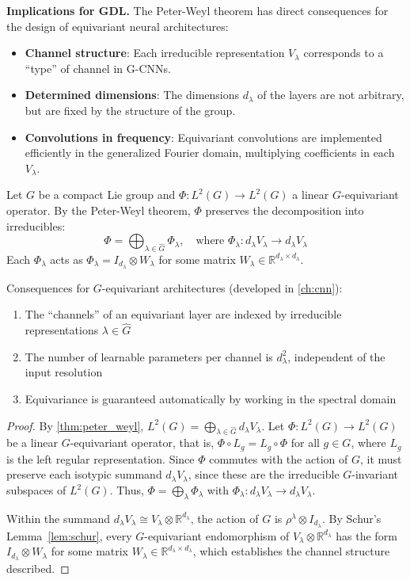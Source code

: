 \textbf{Implications for GDL.} The Peter-Weyl theorem has direct consequences for the design of equivariant neural architectures:
\begin{itemize}
    \item \textbf{Channel structure}: Each irreducible representation $V_\lambda$ corresponds to a ``type'' of channel in G-CNNs.
    \item \textbf{Determined dimensions}: The dimensions $d_\lambda$ of the layers are not arbitrary, but are fixed by the structure of the group.
    \item \textbf{Convolutions in frequency}: Equivariant convolutions are implemented efficiently in the generalized Fourier domain, multiplying coefficients in each $V_\lambda$.
\end{itemize}

\begin{corollary}\label{cor:peter_weyl_gcnn}
	Let $G$ be a compact Lie group and $\Phi: L^2(G) \to L^2(G)$ a linear $G$-equivariant operator. By the Peter-Weyl theorem, $\Phi$ preserves the decomposition into irreducibles:
	\[
		\Phi = \bigoplus_{\lambda \in \widehat{G}} \Phi_\lambda, \quad \text{where } \Phi_\lambda: d_\lambda V_\lambda \to d_\lambda V_\lambda
	\]
	Each $\Phi_\lambda$ acts as $\Phi_\lambda = I_{d_\lambda} \otimes W_\lambda$ for some matrix $W_\lambda \in \mathbb{R}^{d_\lambda \times d_\lambda}$.

	Consequences for $G$-equivariant architectures (developed in \autoref{ch:cnn}):
	\begin{enumerate}
		\item The ``channels'' of an equivariant layer are indexed by irreducible representations $\lambda \in \widehat{G}$
		\item The number of learnable parameters per channel is $d_\lambda^2$, independent of the input resolution
		\item Equivariance is guaranteed automatically by working in the spectral domain
	\end{enumerate}
\end{corollary}

\begin{proof}
By \autoref{thm:peter_weyl}, $L^2(G) = \bigoplus_{\lambda \in \widehat{G}} d_\lambda V_\lambda$. Let $\Phi: L^2(G) \to L^2(G)$ be a linear $G$-equivariant operator, that is, $\Phi \circ L_g = L_g \circ \Phi$ for all $g \in G$, where $L_g$ is the left regular representation. Since $\Phi$ commutes with the action of $G$, it must preserve each isotypic summand $d_\lambda V_\lambda$, since these are the irreducible $G$-invariant subspaces of $L^2(G)$. Thus, $\Phi = \bigoplus_\lambda \Phi_\lambda$ with $\Phi_\lambda: d_\lambda V_\lambda \to d_\lambda V_\lambda$.

Within the summand $d_\lambda V_\lambda \cong V_\lambda \otimes \mathbb{R}^{d_\lambda}$, the action of $G$ is $\rho^\lambda \otimes I_{d_\lambda}$. By Schur's Lemma~\ref{lem:schur}, every $G$-equivariant endomorphism of $V_\lambda \otimes \mathbb{R}^{d_\lambda}$ has the form $I_{d_\lambda} \otimes W_\lambda$ for some matrix $W_\lambda \in \mathbb{R}^{d_\lambda \times d_\lambda}$, which establishes the channel structure described.
\end{proof}

